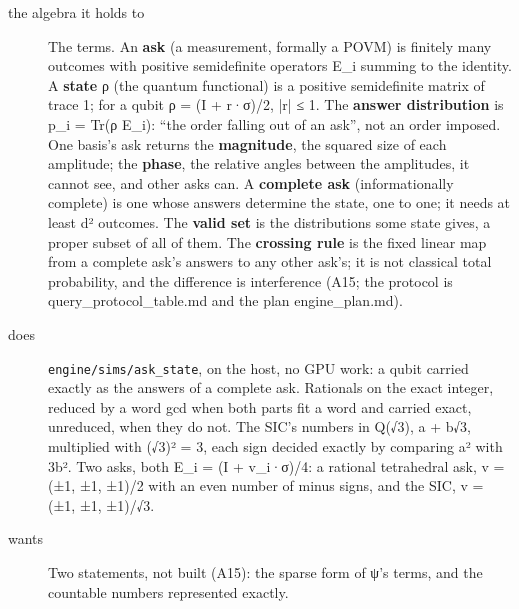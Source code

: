 \begin{description}
\item[{the algebra it holds to}] The terms. An \textbf{ask} (a measurement, formally a POVM) is finitely many outcomes with positive semidefinite operators E\_\allowbreak{}i summing to the identity. A \textbf{state} ρ (the quantum functional) is a positive semidefinite matrix of trace 1; for a qubit ρ = (I + r·σ)/2, |r| ≤ 1. The \textbf{answer distribution} is p\_\allowbreak{}i = Tr(ρ E\_\allowbreak{}i): “the order falling out of an ask”, not an order imposed. One basis's ask returns the \textbf{magnitude}, the squared size of each amplitude; the \textbf{phase}, the relative angles between the amplitudes, it cannot see, and other asks can. A \textbf{complete ask} (informationally complete) is one whose answers determine the state, one to one; it needs at least d² outcomes. The \textbf{valid set} is the distributions some state gives, a proper subset of all of them. The \textbf{crossing rule} is the fixed linear map from a complete ask's answers to any other ask's; it is not classical total probability, and the difference is interference (A15; the protocol is query\_\allowbreak{}protocol\_\allowbreak{}table.md and the plan engine\_\allowbreak{}plan.md).
\item[{does}] \texttt{engine/\allowbreak{}sims/\allowbreak{}ask\_\allowbreak{}state}, on the host, no GPU work: a qubit carried exactly as the answers of a complete ask. Rationals on the exact integer, reduced by a word gcd when both parts fit a word and carried exact, unreduced, when they do not. The SIC's numbers in Q(√3), a + b√3, multiplied with (√3)² = 3, each sign decided exactly by comparing a² with 3b². Two asks, both E\_\allowbreak{}i = (I + v\_\allowbreak{}i·σ)/4: a rational tetrahedral ask, v = (±1, ±1, ±1)/2 with an even number of minus signs, and the SIC, v = (±1, ±1, ±1)/√3.
\item[{wants}] Two statements, not built (A15): the sparse form of ψ's terms, and the countable numbers represented exactly.

\end{description}
